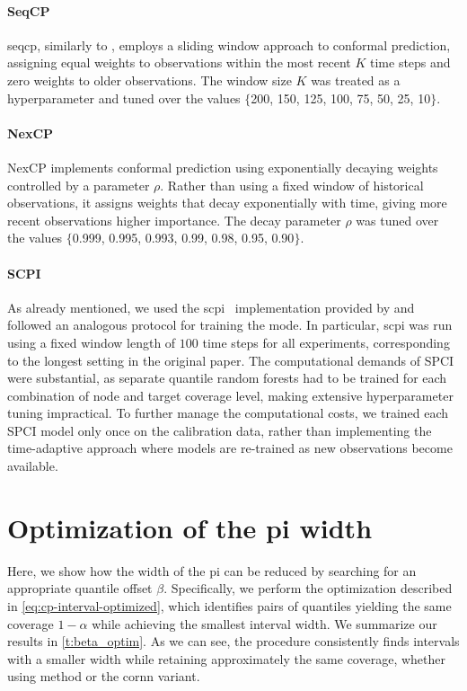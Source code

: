 \paragraph{SeqCP } \gls{seqcp}, similarly to \cite{xu2023conformal}, employs a sliding window approach to conformal prediction, assigning equal weights to observations within the most recent $K$ time steps and zero weights to older observations. The window size $K$ was treated as a hyperparameter and tuned over the values $\{$200, 150, 125, 100, 75, 50, 25, 10$\}$. 


\paragraph{NexCP} NexCP implements conformal prediction using exponentially decaying weights controlled by a parameter $\rho$. Rather than using a fixed window of historical observations, it assigns weights that decay exponentially with time, giving more recent observations higher importance. The decay parameter $\rho$ was tuned over the values $\{$0.999, 0.995, 0.993, 0.99, 0.98, 0.95, 0.90$\}$.

\paragraph{SCPI} As already mentioned, we used the \gls{scpi}~\cite{xu2023sequential} implementation provided by \citet{auer2023conformal} and followed an analogous protocol for training the mode. In particular, \gls{scpi} was run using a fixed window length of $100$ time steps for all experiments, corresponding to the longest setting in the original paper. The computational demands of SPCI were substantial, as separate quantile random forests had to be trained for each combination of node and target coverage level, making extensive hyperparameter tuning impractical. To further manage the computational costs, we trained each SPCI model only once on the calibration data, rather than implementing the time-adaptive approach where models are re-trained as new observations become available.

\section{Optimization of the \gls{pi} width}\label{a:beta}

Here, we show how the width of the \gls{pi} can be reduced by searching for an appropriate quantile offset $\beta$.
Specifically, we perform the optimization described in \autoref{eq:cp-interval-optimized}, which identifies pairs of quantiles yielding the same coverage $1-\alpha$ while achieving the smallest interval width. 
We summarize our results in \autoref{t:beta_optim}. 
As we can see, the procedure consistently finds intervals with a smaller width while retaining approximately the same coverage, whether using \gls{method} or the \gls{cornn} variant.


